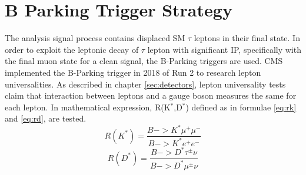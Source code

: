 \clearpage
\chapter{B Parking Trigger Strategy}\label{sec:triggers}
The analysis signal process contains displaced SM $\tau$ leptons in their final state.
In order to exploit the leptonic decay of $\tau$ lepton with significant IP, specifically with the final muon state for a clean signal, the B-Parking triggers are used.
CMS implemented the B-Parking trigger in 2018 of Run 2 to research lepton universalities.
As described in chapter \ref{sec:detectors}, lepton universality tests claim that interaction between leptons and a gauge boson measures the same for each lepton.
In mathematical expression, R(K$^{*}$,D$^{*}$) defined as in formulae \ref{eq:rk} and \ref{eq:rd}, are tested.
\begin{equation}
\label{eq:rk}
	R(K^{*})  = \frac{B->K^{*}\mu^{+}\mu^{-}}{B->K^{*}e^{+}e^{-}} 
\end{equation}
\begin{equation}
\label{eq:rd}
	R(D^{*})  = \frac{B->D^{*}\tau^{\pm}\nu}{B->D^{*}\mu^{\pm}\nu} 
\end{equation}


